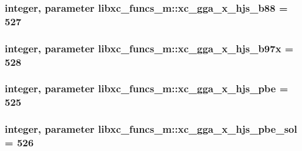 \hypertarget{classlibxc__funcs__m_ad8b00ab7d5f8e8df0552c83acae60d0e}{
\subsubsection[{xc\-\_\-gga\-\_\-x\-\_\-hjs\-\_\-b88}]{\setlength{\rightskip}{0pt plus 5cm}integer, parameter libxc\-\_\-funcs\-\_\-m\-::xc\-\_\-gga\-\_\-x\-\_\-hjs\-\_\-b88 = 527}}\label{classlibxc__funcs__m_ad8b00ab7d5f8e8df0552c83acae60d0e}
\hypertarget{classlibxc__funcs__m_a096b2c3ec6e4958d9c2f63131e5875ec}{
\subsubsection[{xc\-\_\-gga\-\_\-x\-\_\-hjs\-\_\-b97x}]{\setlength{\rightskip}{0pt plus 5cm}integer, parameter libxc\-\_\-funcs\-\_\-m\-::xc\-\_\-gga\-\_\-x\-\_\-hjs\-\_\-b97x = 528}}\label{classlibxc__funcs__m_a096b2c3ec6e4958d9c2f63131e5875ec}
\hypertarget{classlibxc__funcs__m_a5a783d1dc9611f9e37b7e7afac47491e}{
\subsubsection[{xc\-\_\-gga\-\_\-x\-\_\-hjs\-\_\-pbe}]{\setlength{\rightskip}{0pt plus 5cm}integer, parameter libxc\-\_\-funcs\-\_\-m\-::xc\-\_\-gga\-\_\-x\-\_\-hjs\-\_\-pbe = 525}}\label{classlibxc__funcs__m_a5a783d1dc9611f9e37b7e7afac47491e}
\hypertarget{classlibxc__funcs__m_a6d1be1d6896045ff4d5f662d62faa8ec}{
\subsubsection[{xc\-\_\-gga\-\_\-x\-\_\-hjs\-\_\-pbe\-\_\-sol}]{\setlength{\rightskip}{0pt plus 5cm}integer, parameter libxc\-\_\-funcs\-\_\-m\-::xc\-\_\-gga\-\_\-x\-\_\-hjs\-\_\-pbe\-\_\-sol = 526}}\label{classlibxc__funcs__m_a6d1be1d6896045ff4d5f662d62faa8ec}
